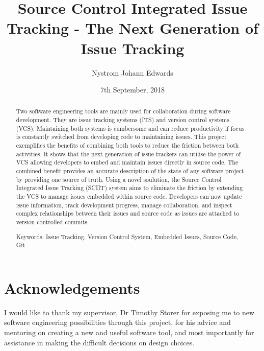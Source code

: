 \documentclass{mproj}
\begin{document}
\title{Source Control Integrated Issue Tracking - The Next Generation of Issue Tracking}
\author{Nystrom Johann Edwards}
\date{7th September, 2018}
\maketitle

\begin{abstract}
Two software engineering tools are mainly used for collaboration during software development. They are issue tracking systems (ITS) and version control systems (VCS). Maintaining both systems is cumbersome and can reduce productivity if focus is constantly switched from developing code to maintaining issues. This project exemplifies the benefits of combining both tools to reduce the friction between both activities. It shows that the next generation of issue trackers can utilise the power of VCS allowing developers to embed and maintain issues directly in source code. The combined benefit provides an accurate description of the state of any software project by providing one source of truth. Using a novel soulution, the Source Control Integrated Issue Tracking (SCIIT) system aims to eliminate the friction by extending the VCS to manage issues embedded within source code. Developers can now update issue information, track development progress, manage collaboration, and inspect complex relationships between their issues and source code as issues are attached to version controlled commits.  

Keywords: Issue Tracking, Version Control System, Embedded Issues, Source Code, Git
\end{abstract}

\educationalconsent
\newpage

\section*{Acknowledgements}

I would like to thank my supervisor, Dr Timothy Storer for exposing me to new software engineering possibilities through this project, for his advice and mentoring on creating a new and useful software tool, and most importantly for assistance in making the difficult decisions on design choices.
\end{document}
